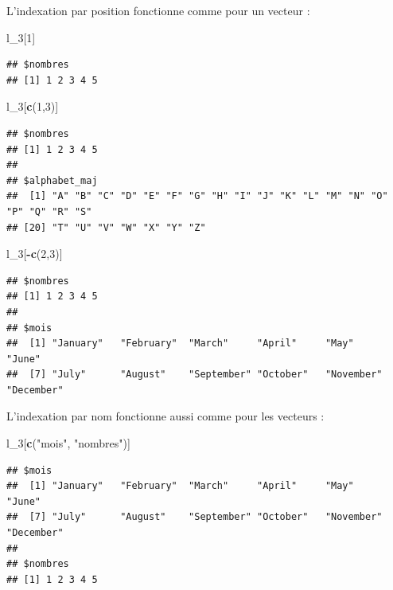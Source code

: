 \documentclass[
  11pt,
]{book}
\newenvironment{Shaded}{\begin{snugshade}}{\end{snugshade}}
\newcommand{\DecValTok}[1]{\textcolor[rgb]{0.00,0.00,0.81}{#1}}
\newcommand{\FunctionTok}[1]{\textcolor[rgb]{0.13,0.29,0.53}{\textbf{#1}}}
\newcommand{\NormalTok}[1]{#1}
\newcommand{\SpecialCharTok}[1]{\textcolor[rgb]{0.81,0.36,0.00}{\textbf{#1}}}
\newcommand{\StringTok}[1]{\textcolor[rgb]{0.31,0.60,0.02}{#1}}
\numberwithin{equation}{section}
\numberwithin{countremarque}{section}
\begin{document}
L'indexation par position fonctionne comme pour un vecteur :

\begin{Shaded}
\begin{Highlighting}[]
\NormalTok{l\_3[}\DecValTok{1}\NormalTok{]}
\end{Highlighting}
\end{Shaded}

\begin{lstlisting}
## $nombres
## [1] 1 2 3 4 5
\end{lstlisting}

\begin{Shaded}
\begin{Highlighting}[]
\NormalTok{l\_3[}\FunctionTok{c}\NormalTok{(}\DecValTok{1}\NormalTok{,}\DecValTok{3}\NormalTok{)]}
\end{Highlighting}
\end{Shaded}

\begin{lstlisting}
## $nombres
## [1] 1 2 3 4 5
## 
## $alphabet_maj
##  [1] "A" "B" "C" "D" "E" "F" "G" "H" "I" "J" "K" "L" "M" "N" "O" "P" "Q" "R" "S"
## [20] "T" "U" "V" "W" "X" "Y" "Z"
\end{lstlisting}

\begin{Shaded}
\begin{Highlighting}[]
\NormalTok{l\_3[}\SpecialCharTok{{-}}\FunctionTok{c}\NormalTok{(}\DecValTok{2}\NormalTok{,}\DecValTok{3}\NormalTok{)]}
\end{Highlighting}
\end{Shaded}

\begin{lstlisting}
## $nombres
## [1] 1 2 3 4 5
## 
## $mois
##  [1] "January"   "February"  "March"     "April"     "May"       "June"     
##  [7] "July"      "August"    "September" "October"   "November"  "December"
\end{lstlisting}

L'indexation par nom fonctionne aussi comme pour les vecteurs :

\begin{Shaded}
\begin{Highlighting}[]
\NormalTok{l\_3[}\FunctionTok{c}\NormalTok{(}\StringTok{"mois"}\NormalTok{, }\StringTok{"nombres"}\NormalTok{)]}
\end{Highlighting}
\end{Shaded}

\begin{lstlisting}
## $mois
##  [1] "January"   "February"  "March"     "April"     "May"       "June"     
##  [7] "July"      "August"    "September" "October"   "November"  "December" 
## 
## $nombres
## [1] 1 2 3 4 5
\end{lstlisting}
\end{document}
